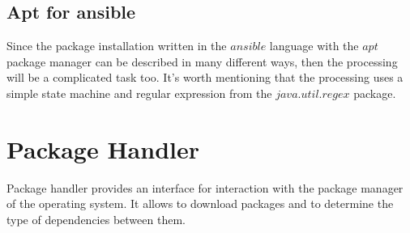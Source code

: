 \subsection*{Apt for ansible}
Since the package installation written in the $ansible$ language with the $apt$ package manager can be described in many different ways, then the processing will be a complicated task too.
It's worth mentioning that the processing uses a simple state machine and regular expression from the $java$.$util$.$regex$ package.

\section{Package Handler}
Package handler provides an interface for interaction with the package manager of the operating system.
It allows to download packages and to determine the type of dependencies between them.

